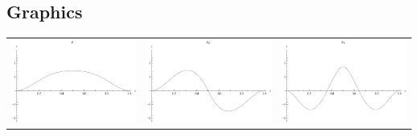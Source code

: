 \documentclass{article}
\begin{document}
\begin{landscape}
\subsection{Graphics}
\begin{tabular}{ccc}
\includegraphics[width=6.7cm]{biquadratic_bspline_1.pdf}& \includegraphics[width=6.7cm]{biquadratic_bspline_2.pdf}& \includegraphics[width=6.7cm]{biquadratic_bspline_3.pdf} \\

\end{tabular}
\end{landscape}
\end{document}
